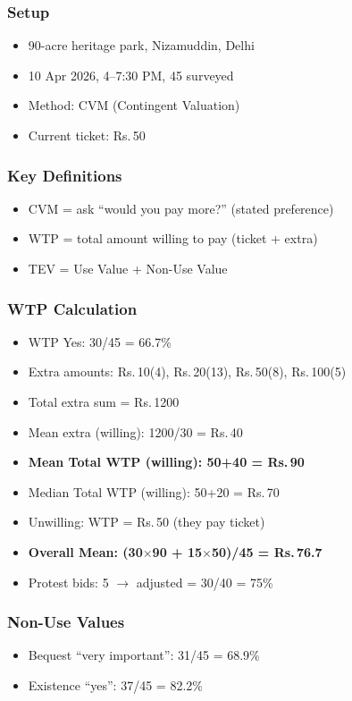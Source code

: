 \documentclass[11pt, a4paper]{article}
\newcommand{\rupee}{Rs.\,}
\begin{document}
\begin{minipage}[t]{0.48\textwidth}
\subsubsection*{\color{navy}Setup}
\begin{itemize}[nosep, leftmargin=*]
\item 90-acre heritage park, Nizamuddin, Delhi
\item 10 Apr 2026, 4--7:30 PM, 45 surveyed
\item Method: CVM (Contingent Valuation)
\item Current ticket: \rupee 50
\end{itemize}

\subsubsection*{\color{navy}Key Definitions}
\begin{itemize}[nosep, leftmargin=*]
\item CVM = ask ``would you pay more?'' (stated preference)
\item WTP = total amount willing to pay (ticket + extra)
\item TEV = Use Value + Non-Use Value
\end{itemize}

\subsubsection*{\color{navy}WTP Calculation}
\begin{itemize}[nosep, leftmargin=*]
\item WTP Yes: 30/45 = 66.7\%
\item Extra amounts: \rupee 10(4), \rupee 20(13), \rupee 50(8), \rupee 100(5)
\item Total extra sum = \rupee 1200
\item Mean extra (willing): 1200/30 = \rupee 40
\item \textbf{Mean Total WTP (willing): 50+40 = \rupee 90}
\item Median Total WTP (willing): 50+20 = \rupee 70
\item Unwilling: WTP = \rupee 50 (they pay ticket)
\item \textbf{Overall Mean: (30$\times$90 + 15$\times$50)/45 = \rupee 76.7}
\item Protest bids: 5 $\rightarrow$ adjusted = 30/40 = 75\%
\end{itemize}

\subsubsection*{\color{navy}Non-Use Values}
\begin{itemize}[nosep, leftmargin=*]
\item Bequest ``very important'': 31/45 = 68.9\%
\item Existence ``yes'': 37/45 = 82.2\%
\end{itemize}
\end{minipage}
\end{document}
